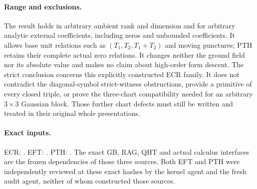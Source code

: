 \paragraph{Range and exclusions.}
The result holds in arbitrary ambient rank and dimension and for
arbitrary analytic external coefficients, including zeros and
unbounded coefficients.  It allows base unit relations such as
$(T_1,T_2,T_1+T_2)$ and moving punctures; PTH retains their complete
actual zero relations.  It changes neither the ground field nor
its absolute value and makes no claim about high-order form descent.
The strict conclusion concerns this explicitly constructed ECR
family.  It does not contradict the diagonal-symbol strict-witness
obstructions, provide a primitive of every closed triple, or prove
the three-chart compatibility needed for an arbitrary $3\times3$
Gaussian block.  Those further chart defects must still be written
and treated in their original whole presentations.

\paragraph{Exact inputs.}
ECR: .
EFT: .
PTH: .
The exact GB, RAG, QHT and actual calculus interfaces are the
frozen dependencies of those three sources.  Both EFT and PTH
were independently reviewed at these exact hashes by the kernel
agent and the fresh audit agent, neither of whom constructed
those sources.
